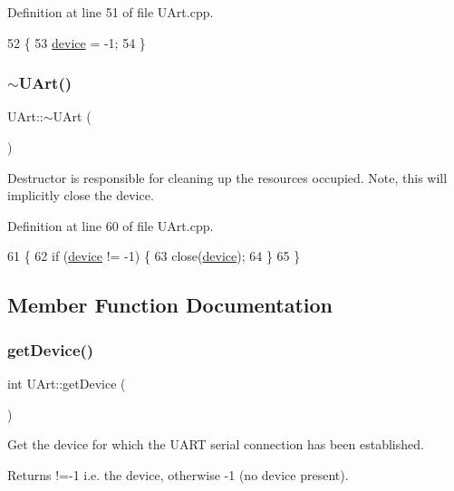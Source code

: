 Definition at line 51 of file U\+Art.\+cpp.


\begin{DoxyCode}
52 \{
53     \hyperlink{class_u_art_a61fb55cc7c92c85f2219dffcfb58bc12}{device} = -1;
54 \}
\end{DoxyCode}
\mbox{\label{class_u_art_af512edbca927cd2c76b72c33c13c93d0}} 
\subsubsection{\texorpdfstring{$\sim$\+U\+Art()}{~UArt()}}
{\footnotesize\ttfamily U\+Art\+::$\sim$\+U\+Art (\begin{DoxyParamCaption}{ }\end{DoxyParamCaption})}

Destructor is responsible for cleaning up the resources occupied. Note, this will implicitly close the device. 

Definition at line 60 of file U\+Art.\+cpp.


\begin{DoxyCode}
61 \{
62     \textcolor{keywordflow}{if} (\hyperlink{class_u_art_a61fb55cc7c92c85f2219dffcfb58bc12}{device} != -1) \{
63         close(\hyperlink{class_u_art_a61fb55cc7c92c85f2219dffcfb58bc12}{device});
64     \}
65 \}
\end{DoxyCode}


\subsection{Member Function Documentation}
\mbox{\label{class_u_art_aa7d8ab3e9439a553764e0fd81d83f143}} 
\subsubsection{\texorpdfstring{get\+Device()}{getDevice()}}
{\footnotesize\ttfamily int U\+Art\+::get\+Device (\begin{DoxyParamCaption}{ }\end{DoxyParamCaption})}

Get the device for which the U\+A\+RT serial connection has been established.

\begin{DoxyReturn}{Returns}
!=-\/1 i.\+e. the device, otherwise -\/1 (no device present). 
\end{DoxyReturn}



